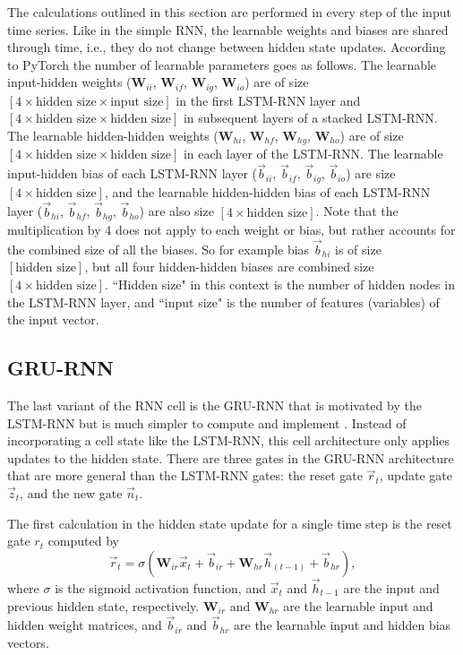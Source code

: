 The calculations outlined in this section are performed in every step of the input time series. Like in the simple \ac{RNN}, the learnable weights and biases are shared through time, i.e., they do not change between hidden state updates. According to PyTorch \cite{PyTorch} the number of learnable parameters goes as follows. The learnable input-hidden weights ($\textbf{W}_{ii}$, $\textbf{W}_{if}$, $\textbf{W}_{ig}$, $\textbf{W}_{io}$) are of size $\left[\text{4} \times \text{hidden size} \times \text{input size}\right]$ in the first \ac{LSTM-RNN} layer and $\left[\text{4} \times \text{hidden size} \times \text{hidden size}\right]$ in subsequent layers of a stacked \ac{LSTM-RNN}. The learnable hidden-hidden weights ($\textbf{W}_{hi}$, $\textbf{W}_{hf}$, $\textbf{W}_{hg}$, $\textbf{W}_{ho}$) are of size $\left[4 \times \text{hidden size} \times \text{hidden size}\right]$ in each layer of the \ac{LSTM-RNN}. The learnable input-hidden bias of each \ac{LSTM-RNN} layer ($\vec{b}_{ii}$, $\vec{b}_{if}$, $\vec{b}_{ig}$, $\vec{b}_{io}$) are size $\left[4 \times \text{hidden size}\right]$, and the learnable hidden-hidden bias of each \ac{LSTM-RNN} layer ($\vec{b}_{hi}$, $\vec{b}_{hf}$, $\vec{b}_{hg}$, $\vec{b}_{ho}$) are also size $\left[4 \times \text{hidden size}\right]$. Note that the multiplication by 4 does not apply to each weight or bias, but rather accounts for the combined size of all the biases. So for example bias $\vec{b}_{hi}$ is of size $\left[\text{hidden size}\right]$, but all four hidden-hidden biases are combined size $\left[4 \times \text{hidden size}\right]$. ``Hidden size" in this context is the number of hidden nodes in the \ac{LSTM-RNN} layer, and ``input size" is the number of features (variables) of the input vector.

\subsection{GRU-RNN}
The last variant of the \ac{RNN} cell is the \ac{GRU-RNN} that is motivated by the \ac{LSTM-RNN} but is much simpler to compute and implement \cite{GRU_original}. Instead of incorporating a cell state like the \ac{LSTM-RNN}, this cell architecture only applies updates to the hidden state. There are three gates in the \ac{GRU-RNN} architecture that are more general than the \ac{LSTM-RNN} gates: the reset gate $\vec{r}_{t}$, update gate $\vec{z}_{t}$, and the new gate $\vec{n}_{t}$.

The first calculation in the hidden state update for a single time step is the reset gate $r_{t}$ computed by
\begin{equation} \label{eq:GRU_reset_gate}
	\vec{r}_{t} = \sigma\left(\textbf{W}_{ir} \vec{x}_{t} + \vec{b}_{ir} + \textbf{W}_{hr} \vec{h}_{\left(t-1\right)} + \vec{b}_{hr}\right),
\end{equation}
where $\sigma$ is the sigmoid activation function, and $\vec{x}_{t}$ and $\vec{h}_{t-1}$ are the input and previous hidden state, respectively. $\textbf{W}_{ir}$ and $\textbf{W}_{hr}$ are the learnable input and hidden weight matrices, and $\vec{b}_{ir}$ and $\vec{b}_{hr}$ are the learnable input and hidden bias vectors.

